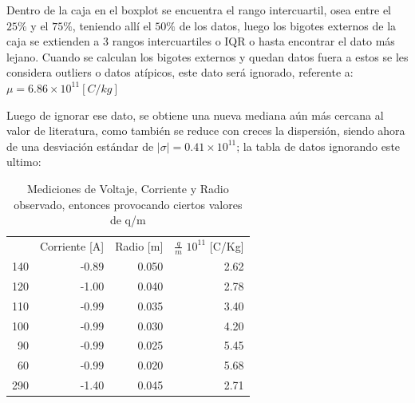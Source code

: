\documentclass[a4paper,twocolumn,10pt]{article}
\begin{document}
Dentro de la caja en el boxplot se encuentra el rango intercuartil, osea entre el $25\%$ y el $75\%$, teniendo allí el $50\%$ de los datos, luego los bigotes externos de la caja se extienden a 3 rangos intercuartiles o IQR o hasta encontrar el dato más lejano. Cuando se calculan los bigotes externos y quedan datos fuera a estos se les considera outliers o datos atípicos, este dato será ignorado, referente a: $\mu = 6.86 \times 10^{11} [C/kg]$

Luego de ignorar ese dato, se obtiene una nueva mediana aún más cercana al valor de literatura, como también se reduce con creces la dispersión, siendo ahora de una desviación estándar de $|\sigma| = 0.41 \times 10^{11}$; la tabla de datos ignorando este ultimo:


\begin{table}
\centering
\caption{Mediciones de Voltaje, Corriente y Radio observado, entonces provocando ciertos valores de q/m}
\begin{tabular}{rrrr}
\rowcolor[rgb]{0.753,0.753,0.753} \multicolumn{1}{l}{Volts} & \multicolumn{1}{l}{Corriente [A]} & \multicolumn{1}{l}{Radio [m]} & \multicolumn{1}{l}{$\frac{q}{m}$ $10^{11}$ [C/Kg] }  \\
140                                                         & -0.89                             & 0.050                         & 2.62                              \\
120                                                         & -1.00                             & 0.040                         & 2.78                              \\
110                                                         & -0.99                             & 0.035                         & 3.40                              \\
100                                                         & -0.99                             & 0.030                         & 4.20                              \\
90                                                          & -0.99                             & 0.025                         & 5.45                              \\
60                                                          & -0.99                             & 0.020                         & 5.68                              \\
290                                                         & -1.40                             & 0.045                         & 2.71                              \\

\end{tabular}
\end{table}
\end{document}
